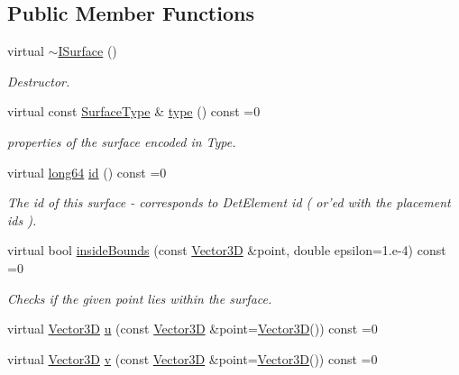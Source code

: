 \subsection*{Public Member Functions}
\begin{DoxyCompactItemize}
\item 
virtual \hyperlink{class_d_d_surfaces_1_1_i_surface_a80873dc47fb91dabae0f389de8b32055}{$\sim$ISurface} ()
\begin{DoxyCompactList}\small\item\em Destructor. \item\end{DoxyCompactList}\item 
virtual const \hyperlink{class_d_d_surfaces_1_1_surface_type}{SurfaceType} \& \hyperlink{class_d_d_surfaces_1_1_i_surface_aab772d11a61d7ae966d535be0da2a626}{type} () const =0
\begin{DoxyCompactList}\small\item\em properties of the surface encoded in Type. \item\end{DoxyCompactList}\item 
virtual \hyperlink{namespace_d_d_surfaces_ab6b3da366f31f80aec56447ac4442e78}{long64} \hyperlink{class_d_d_surfaces_1_1_i_surface_aaf7bf967d4a0652c620ec9754a2b37c1}{id} () const =0
\begin{DoxyCompactList}\small\item\em The id of this surface -\/ corresponds to DetElement id ( or'ed with the placement ids ). \item\end{DoxyCompactList}\item 
virtual bool \hyperlink{class_d_d_surfaces_1_1_i_surface_a16aa78cb8c01cd5993b7cf23f55a7e3a}{insideBounds} (const \hyperlink{class_d_d_surfaces_1_1_vector3_d}{Vector3D} \&point, double epsilon=1.e-\/4) const =0
\begin{DoxyCompactList}\small\item\em Checks if the given point lies within the surface. \item\end{DoxyCompactList}\item 
virtual \hyperlink{class_d_d_surfaces_1_1_vector3_d}{Vector3D} \hyperlink{class_d_d_surfaces_1_1_i_surface_a09fd4aa43cc96d50b4b81b94107f7d8f}{u} (const \hyperlink{class_d_d_surfaces_1_1_vector3_d}{Vector3D} \&point=\hyperlink{class_d_d_surfaces_1_1_vector3_d}{Vector3D}()) const =0
\item 
virtual \hyperlink{class_d_d_surfaces_1_1_vector3_d}{Vector3D} \hyperlink{class_d_d_surfaces_1_1_i_surface_a61c9f2057ea0383b39ead13a147b2838}{v} (const \hyperlink{class_d_d_surfaces_1_1_vector3_d}{Vector3D} \&point=\hyperlink{class_d_d_surfaces_1_1_vector3_d}{Vector3D}()) const =0

\end{DoxyCompactItemize}

